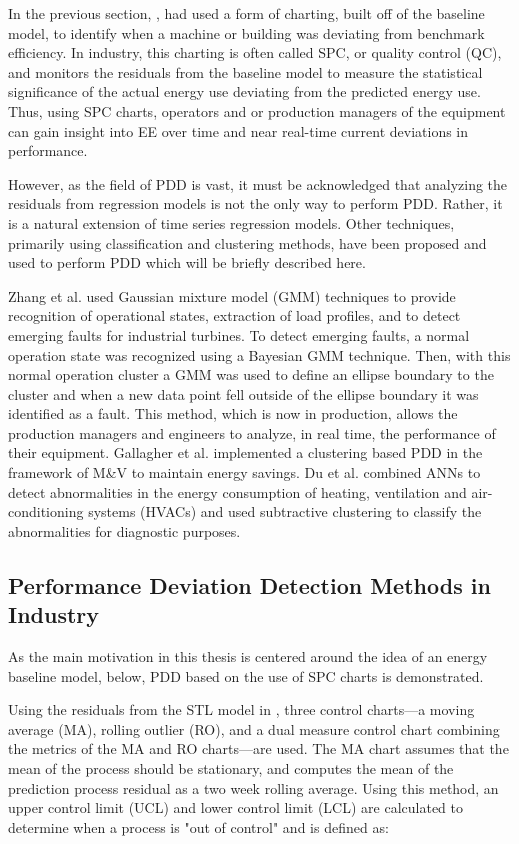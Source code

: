 In the previous section, \cite{tightening}\cite{cas}\cite{boiler}, had used a form of charting, built off of the baseline model, to identify when a machine or building was deviating from benchmark efficiency. In industry, this charting is often called SPC, or quality control (QC), and monitors the residuals from the baseline model to measure the statistical significance of the actual energy use deviating from the predicted energy use. Thus, using SPC charts, operators and or production managers of the equipment can gain insight into EE over time and near real-time current deviations in performance.

However, as the field of PDD is vast, it must be acknowledged that analyzing the residuals from regression models is not the only way to perform PDD. Rather, it is a natural extension of time series regression models. Other techniques, primarily using classification and clustering methods, have been proposed and used to perform PDD which will be briefly described here.

Zhang et al. \cite{gas-turbine-faults} used Gaussian mixture model (GMM) techniques to provide recognition of operational states, extraction of load profiles, and to detect emerging faults for industrial turbines. To detect emerging faults, a normal operation state was recognized using a Bayesian GMM technique. Then, with this normal operation cluster a GMM was used to define an ellipse boundary to the cluster and when a new data point fell outside of the ellipse boundary it was identified as a fault. This method, which is now in production, allows the production managers and engineers to analyze, in real time, the performance of their equipment. Gallagher et al. \cite{intelliMAV} implemented a clustering based PDD in the framework of M&V to maintain energy savings. Du et al. \cite{fault-HVAC} combined ANNs to detect abnormalities in the energy consumption of heating, ventilation and air-conditioning systems (HVACs) and used subtractive clustering to classify the abnormalities for diagnostic purposes.

\subsection{Performance Deviation Detection Methods in Industry}

As the main motivation in this thesis is centered around the idea of an energy baseline model, below, PDD based on the use of SPC charts is demonstrated.

Using the residuals from the STL model in \cite{tightening}, three control charts—a moving average (MA), rolling outlier (RO), and a dual measure control chart combining the metrics of the MA and RO charts—are used. The MA chart assumes that the mean of the process should be stationary, and computes the mean of the prediction process residual as a two week rolling average. Using this method, an upper control limit (UCL) and lower control limit (LCL) are calculated to determine when a process is "out of control" and is defined as:

